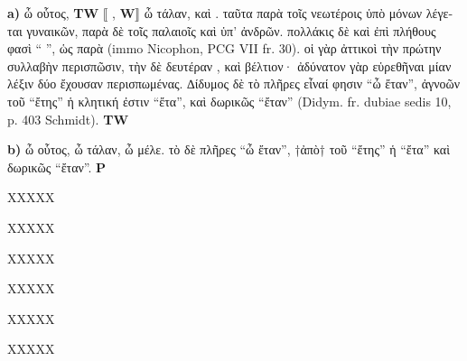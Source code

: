 \documentclass[11pt,a4paper]{book}
\begin{document}
\begin{greek}
\begin{pairs}
\begin{Leftside}
\resumenumbering
\numberpstartfalse
\pstart
\noindent\textbf{a)} ὦ οὗτος, \textbf{TW} ⟦%
,
\textbf{W}⟧ ὦ τάλαν, καὶ . ταῦτα παρὰ τοῖς νεωτέροις ὑπὸ
        μόνων λέγεται γυναικῶν, παρὰ δὲ τοῖς παλαιοῖς καὶ ὑπ'
        ἀνδρῶν. πολλάκις δὲ καὶ ἐπὶ πλήθους φασὶ “%
        ”, ὡς παρὰ
        (immo Nicophon, PCG VII fr. 30). οἱ γὰρ ἀττικοὶ τὴν
        πρώτην συλλαβὴν περισπῶσιν, τὴν δὲ δευτέραν
        , καὶ
        βέλτιον· ἀδύνατον γὰρ εὑρεθῆναι μίαν λέξιν δύο ἔχουσαν
        περισπωμένας. ∆ίδυμος δὲ τὸ πλῆρες εἶναί φησιν “ὦ ἔταν”,
        ἀγνοῶν
         τοῦ “ἔτης” ἡ κλητική ἐστιν
        “ἔτα”, καὶ δωρικῶς “ἔταν” (Didym. fr. dubiae sedis 10, p. 403 Schmidt). \textbf{TW}
\pend
\pausenumbering
\end{Leftside}

\begin{Rightside}
\resumenumbering
\numberpstartfalse
\pstart
\noindent{}\textbf{b)} ὦ οὗτος, ὦ τάλαν, ὦ μέλε. τὸ δὲ
        πλῆρες “ὦ ἔταν”, †ἀπὸ† τοῦ “ἔτης” ἡ  “ἔτα” καὶ δωρικῶς
        “ἔταν”. \textbf{P}\pend
\pausenumbering
\end{Rightside}
\end{pairs}
\Columns

\numberpstarttrue
\resumenumbering

\pstart XXXXX\pend

\pstart{}XXXXX\pend

\pstart{}XXXXX\pend

\pstart{}XXXXX\pend

\pstart{}XXXXX\pend

\pstart{}XXXXX\pend


\numberpstartfalse
\endnumbering

\end{greek}
\end{document}
